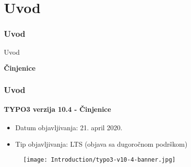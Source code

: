 %

\section{Uvod}
\begin{frame}[fragile]
	\frametitle{Uvod}

	\begin{center}\huge{Uvod}\end{center}
	\begin{center}\huge{\color{typo3darkgrey}\textbf{Činjenice}}\end{center}

\end{frame}


\begin{frame}[fragile]
	\frametitle{Uvod}
	\framesubtitle{TYPO3 verzija 10.4 - Činjenice}

	\begin{itemize}
		\item Datum objavljivanja: 21. april 2020.
		\item Tip objavljivanja: LTS (objava sa dugoročnom podrškom)
	\end{itemize}

	\begin{figure}
		\texttt{[image: Introduction/typo3-v10-4-banner.jpg]}
	\end{figure}

\end{frame}


